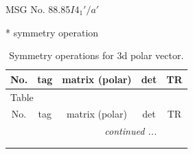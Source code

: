 \documentclass[fleqn,8pt]{jsarticle}
\begin{document}
\setcounter{MaxMatrixCols}{32}

\renewcommand{\tablename}{Table~}
\renewcommand{\figurename}{Figure~}
\begin{center}
\LARGE
MSG No. 88.85\quad$I4_{1}'/a'$
\end{center}
* symmetry operation
\renewcommand{\arraystretch}{1.3}
\begin{longtable}{ccccc}
\caption{Symmetry operations for 3d polar vector.}
 \\
 \hline \hline
No. & tag & matrix (polar) & det & TR \\ \hline \endfirsthead

\multicolumn{4}{l}{\tablename\ \thetable{}} \\
 \hline \hline
No. & tag & matrix (polar) & det & TR \\ \hline \endhead

 \hline \hline
\multicolumn{4}{r}{\footnotesize\it continued ...} \\ \endfoot

 \hline \hline
\multicolumn{4}{r}{} \\ \endlastfoot


\end{longtable}
\end{document}
